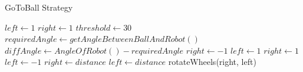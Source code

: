 \documentclass[conference,12pt]{IEEEtran}
\begin{document}
\cleardoublepage

\begin{algorithm}
\label{app:code}
\caption{GoToBall Strategy}
\begin{algorithmic}[1]
	\STATE $left\gets 1$
	\STATE $right\gets 1$
	\STATE $threshold\gets 30$
	\STATE $requiredAngle\gets getAngleBetweenBallAndRobot()$
	\STATE $diffAngle\gets AngleOfRobot() - requiredAngle$
		\STATE $right \gets -1$
		\STATE $left \gets 1$
	\ELSE
		\STATE $right \gets 1$
		\STATE $left \gets -1$
	\ENDIF
		\STATE $right \gets distance$
		\STATE $left \gets distance$
	\ENDIF
	\STATE rotateWheels(right, left)
\ENDWHILE
\end{algorithmic}
\end{algorithm}
\end{document}
